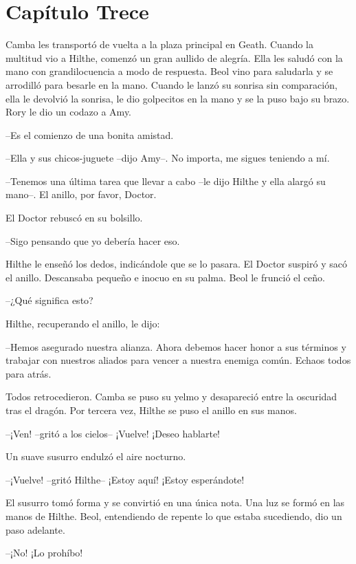 \chapter*{Capítulo Trece}

{Camba les transportó de vuelta a la plaza principal en Geath. Cuando la
	multitud vio a Hilthe, comenzó un gran aullido de alegría. Ella les
	saludó con la mano con grandilocuencia a modo de respuesta. Beol vino
	para saludarla y se arrodilló para besarle en la mano. Cuando le lanzó
	su sonrisa sin comparación, ella le devolvió la sonrisa, le dio
	golpecitos en la mano y se la puso bajo su brazo. Rory le dio un codazo
a Amy.}

{--Es el comienzo de una bonita amistad.}

{--Ella y sus chicos-juguete --dijo Amy--. No importa, me sigues
teniendo a mí.}

{--Tenemos una última tarea que llevar a cabo --le dijo Hilthe y ella
alargó su mano--. El anillo, por favor, Doctor.}

{El Doctor rebuscó en su bolsillo.}

{--Sigo pensando que yo debería hacer eso.}

{Hilthe le enseñó los dedos, indicándole que se lo pasara. El Doctor
	suspiró y sacó el anillo. Descansaba pequeño e inocuo en su palma. Beol
le frunció el ceño.}

{--¿Qué significa esto?}

{Hilthe, recuperando el anillo, le dijo:}

{--Hemos asegurado nuestra alianza. Ahora debemos hacer honor a sus
	términos y trabajar con nuestros aliados para vencer a nuestra enemiga
común. Echaos todos para atrás.}

{Todos retrocedieron. Camba se puso su yelmo y desapareció entre la
	oscuridad tras el dragón. Por tercera vez, Hilthe se puso el anillo en
sus manos.}

{--¡Ven! --gritó a los cielos-- ¡Vuelve! ¡Deseo hablarte!}

{Un suave susurro endulzó el aire nocturno.}

{--¡Vuelve! --gritó Hilthe-- ¡Estoy aquí! ¡Estoy esperándote!}

{El susurro tomó forma y se convirtió en una única nota. Una luz se
	formó en las manos de Hilthe. Beol, entendiendo de repente lo que estaba
sucediendo, dio un paso adelante.}

{--¡No! ¡Lo prohíbo!}

